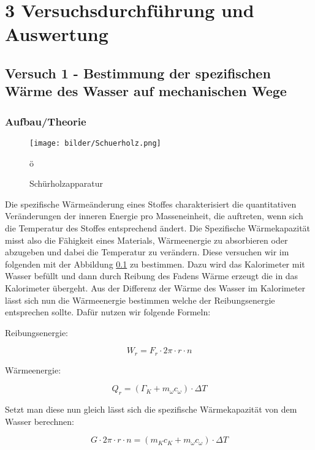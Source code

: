 \chapter*{3 Versuchsdurchführung und Auswertung}
\setcounter{chapter}{3}
\setcounter{section}{0}
\setcounter{subsection}{0}

\section{Versuch 1 - Bestimmung der spezifischen Wärme des Wasser auf mechanischen Wege}
	
	\subsection{Aufbau/Theorie}
	
        \begin{figure}[ht]
            \label{fig:abb1}
            \centering
            \texttt{[image: bilder/Schuerholz.png]}
            \caption{Schürholzapparatur}ö
        \end{figure}

		Die spezifische Wärmeänderung eines Stoffes charakterisiert die quantitativen Veränderungen der inneren Energie pro Masseneinheit, die auftreten, wenn sich die Temperatur des Stoffes entsprechend ändert. Die Spezifische Wärmekapazität misst also die Fähigkeit eines Materials, Wärmeenergie zu absorbieren oder abzugeben und dabei die Temperatur zu verändern. Diese versuchen wir im folgenden mit der Abbildung \ref{fig:abb1} zu bestimmen. Dazu wird das Kalorimeter mit Wasser befüllt und dann durch Reibung des Fadens Wärme erzeugt die in das Kalorimeter übergeht. Aus der Differenz der Wärme des Wasser im Kalorimeter lässt sich nun die Wärmeenergie bestimmen welche der Reibungsenergie entsprechen sollte.
		Dafür nutzen wir folgende Formeln:
		
		Reibungsenergie:

		$$W_{r} = F_{r} \cdot 2\pi \cdot r \cdot n$$
		
		Wärmeenergie:

		$$Q_{r} =  (\Gamma_{K} + m_{\omega}c_{\omega}) \cdot \Delta T$$
		
		Setzt man diese nun gleich lässt sich die spezifische Wärmekapazität von dem Wasser berechnen:

		$$G \cdot 2\pi \cdot r \cdot n = (m_{K}c_{K} + m_{\omega}c_{\omega}) \cdot \Delta T$$

